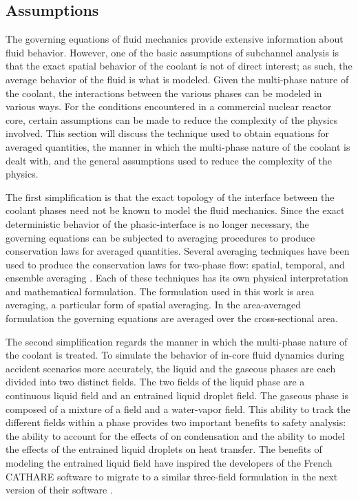 \subsection{Assumptions}
\label{subsect:assumptions}

The governing equations of fluid mechanics provide extensive information about fluid behavior.
However, one of the basic assumptions of subchannel analysis is that the exact spatial behavior of the coolant is not of direct interest; as such, the average behavior of the fluid is what is modeled.
Given the multi-phase nature of the coolant, the interactions between the various phases can be modeled in various ways.
For the conditions encountered in a commercial nuclear reactor core, certain assumptions can be made to reduce the complexity of the physics involved.
This section will discuss the technique used to obtain equations for averaged quantities, the manner in which the multi-phase nature of the coolant is dealt with, and the general assumptions used to reduce the complexity of the physics.

The first simplification is that the exact topology of the interface between the coolant phases need not be known to model the fluid mechanics.
Since the exact deterministic behavior of the phasic-interface is no longer necessary, the governing equations can be subjected to averaging procedures to produce conservation laws for averaged quantities.
Several averaging techniques have been used to produce the conservation laws for two-phase flow: spatial, temporal, and ensemble averaging \cite{Drew1998, Todreas2011}.
Each of these techniques has its own physical interpretation and mathematical formulation.
The formulation used in this work is area averaging, a particular form of spatial averaging.
In the area-averaged formulation the governing equations are averaged over the cross-sectional area.

The second simplification regards the manner in which the multi-phase nature of the coolant is treated.
To simulate the behavior of in-core fluid dynamics during accident scenarios more accurately, the liquid and the gaseous phases are each divided into two distinct fields.
The two fields of the liquid phase are a continuous liquid field and an entrained liquid droplet field.
The gaseous phase is composed of a mixture of a \ncg{} field and a water-vapor field. 
This ability to track the different fields within a phase provides two important benefits to safety analysis: the ability to account for the effects of \ncgs{} on condensation and the ability to model the effects of the entrained liquid droplets on heat transfer.
The benefits of modeling the entrained liquid field have inspired the developers of the French CATHARE software to migrate to a similar three-field formulation in the next version of their software \cite{Emonot2011}.

